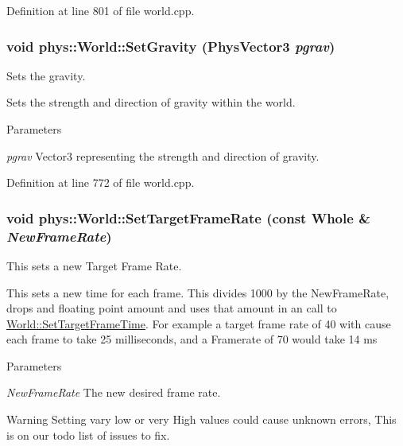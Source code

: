 Definition at line 801 of file world.cpp.

\hypertarget{classphys_1_1World_a3779f811ca8a394a20fc2d92823b5f93}{
\subsubsection[{SetGravity}]{\setlength{\rightskip}{0pt plus 5cm}void phys::World::SetGravity ({\bf PhysVector3} {\em pgrav})}}
\label{da/ddf/classphys_1_1World_a3779f811ca8a394a20fc2d92823b5f93}


Sets the gravity. 

Sets the strength and direction of gravity within the world. 
\begin{DoxyParams}{Parameters}
\item[{\em pgrav}]Vector3 representing the strength and direction of gravity. \end{DoxyParams}


Definition at line 772 of file world.cpp.

\hypertarget{classphys_1_1World_a76dfcde35392291aafd6eb1a64b3c95c}{
\subsubsection[{SetTargetFrameRate}]{\setlength{\rightskip}{0pt plus 5cm}void phys::World::SetTargetFrameRate (const {\bf Whole} \& {\em NewFrameRate})}}
\label{da/ddf/classphys_1_1World_a76dfcde35392291aafd6eb1a64b3c95c}


This sets a new Target Frame Rate. 

This sets a new time for each frame. This divides 1000 by the NewFrameRate, drops and floating point amount and uses that amount in an call to \hyperlink{classphys_1_1World_ad95b5a5ad73e0a05826b5bd834876333}{World::SetTargetFrameTime}. For example a target frame rate of 40 with cause each frame to take 25 milliseconds, and a Framerate of 70 would take 14 ms 
\begin{DoxyParams}{Parameters}
\item[{\em NewFrameRate}]The new desired frame rate. \end{DoxyParams}
\begin{DoxyWarning}{Warning}
Setting vary low or very High values could cause unknown errors, This is on our todo list of issues to fix. 
\end{DoxyWarning}


